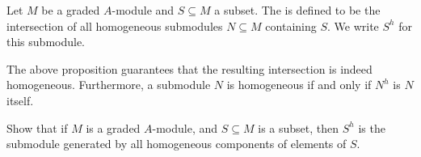 \begin{definition}
	Let $M$ be a graded $A$-module and $S \subseteq M$ a subset. The  is defined to be the intersection of all homogeneous submodules $N \subseteq M$ containing $S$. We write $S^h$ for this submodule.
\end{definition}

The above proposition guarantees that the resulting intersection is indeed homogeneous. Furthermore, a submodule $N$ is homogeneous if and only if $N^h$ is $N$ itself.

\begin{exercise}\label{chap6:homogeneous-submodule-as-direct-sum}
	Show that if $M$ is a graded $A$-module, and $S \subseteq M$ is a subset, then $S^h$ is the submodule generated by all homogeneous components of elements of $S$.
\end{exercise}

